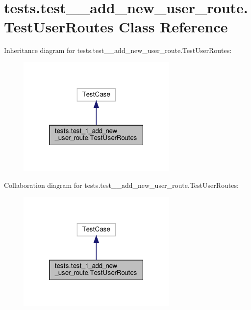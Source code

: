 \hypertarget{classtests_1_1test__1__add__new__user__route_1_1_test_user_routes}{}\section{tests.\+test\+\_\+\_\+add\+\_\+new\+\_\+user\+\_\+route.\+Test\+User\+Routes Class Reference}
\label{classtests_1_1test__1__add__new__user__route_1_1_test_user_routes}


Inheritance diagram for tests.\+test\+\_\+\_\+add\+\_\+new\+\_\+user\+\_\+route.\+Test\+User\+Routes\+:\nopagebreak
\begin{figure}[H]
\begin{center}
\leavevmode
\includegraphics[width=223pt]{classtests_1_1test__1__add__new__user__route_1_1_test_user_routes__inherit__graph}
\end{center}
\end{figure}


Collaboration diagram for tests.\+test\+\_\+\_\+add\+\_\+new\+\_\+user\+\_\+route.\+Test\+User\+Routes\+:\nopagebreak
\begin{figure}[H]
\begin{center}
\leavevmode
\includegraphics[width=223pt]{classtests_1_1test__1__add__new__user__route_1_1_test_user_routes__coll__graph}
\end{center}
\end{figure}
